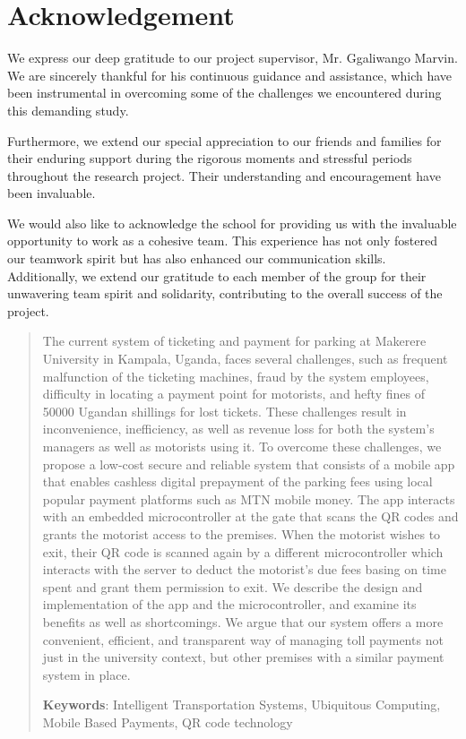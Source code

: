\documentclass[14pt]{report}
\begin{document}
    \clearpage

    \section*{Acknowledgement}
    We express our deep gratitude to our project supervisor, Mr. Ggaliwango Marvin. We are sincerely thankful for his continuous guidance and assistance, which have been instrumental in overcoming some of the challenges we encountered during this demanding study.

    Furthermore, we extend our special appreciation to our friends and families for their enduring support during the rigorous moments and stressful periods throughout the research project. Their understanding and encouragement have been invaluable.

    We would also like to acknowledge the school for providing us with the invaluable opportunity to work as a cohesive team. This experience has not only fostered our teamwork spirit but has also enhanced our communication skills. Additionally, we extend our gratitude to each member of the group for their unwavering team spirit and solidarity, contributing to the overall success of the project.

    \begin{abstract}
        The current system of ticketing and payment for parking at Makerere University in Kampala, Uganda, faces several challenges, such as frequent malfunction of the ticketing machines, fraud by the system employees, difficulty in locating a payment point for motorists, and hefty fines of 50000 Ugandan shillings for lost tickets. These challenges result in inconvenience, inefficiency, as well as revenue loss for both the system’s managers as well as motorists using it. To overcome these challenges, we propose a low-cost secure and reliable system that consists of a mobile app that enables cashless digital prepayment of the parking fees using local popular payment platforms such as MTN mobile money. The app interacts with an embedded microcontroller at the gate that scans the QR codes and grants the motorist access to the premises. When the motorist wishes to exit, their QR code is scanned again by a different microcontroller which interacts with the server to deduct the motorist's due fees basing on time spent and grant them permission to exit. We describe the design and implementation of the app and the microcontroller, and examine its benefits as well as shortcomings. We argue that our system offers a more convenient, efficient, and transparent way of managing toll payments not just in the university context, but other premises with a similar payment system in place.

        \textbf{Keywords}: Intelligent Transportation Systems, Ubiquitous Computing, Mobile Based Payments, QR code technology

    \end{abstract}
\end{document}
